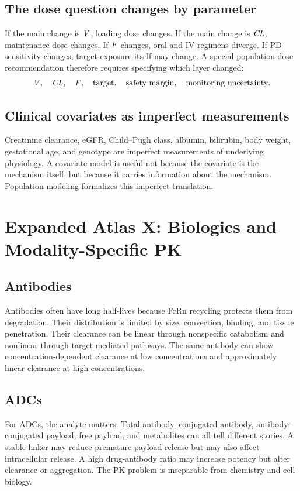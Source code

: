 \subsection{The dose question changes by parameter}

If the main change is \(\pkV\), loading dose changes. If the main change is \(\pkCL\), maintenance dose changes. If \(\pkF\) changes, oral and IV regimens diverge. If PD sensitivity changes, target exposure itself may change. A special-population dose recommendation therefore requires specifying which layer changed:
\[
  \pkV,\quad \pkCL,\quad \pkF,\quad \text{target},\quad \text{safety margin},\quad \text{monitoring uncertainty}.
\]

\subsection{Clinical covariates as imperfect measurements}

Creatinine clearance, eGFR, Child--Pugh class, albumin, bilirubin, body weight, gestational age, and genotype are imperfect measurements of underlying physiology. A covariate model is useful not because the covariate is the mechanism itself, but because it carries information about the mechanism. Population modeling formalizes this imperfect translation.

\section{Expanded Atlas X: Biologics and Modality-Specific PK}

\subsection{Antibodies}

Antibodies often have long half-lives because FcRn recycling protects them from degradation. Their distribution is limited by size, convection, binding, and tissue penetration. Their clearance can be linear through nonspecific catabolism and nonlinear through target-mediated pathways. The same antibody can show concentration-dependent clearance at low concentrations and approximately linear clearance at high concentrations.

\subsection{ADCs}

For ADCs, the analyte matters. Total antibody, conjugated antibody, antibody-conjugated payload, free payload, and metabolites can all tell different stories. A stable linker may reduce premature payload release but may also affect intracellular release. A high drug-antibody ratio may increase potency but alter clearance or aggregation. The PK problem is inseparable from chemistry and cell biology.

